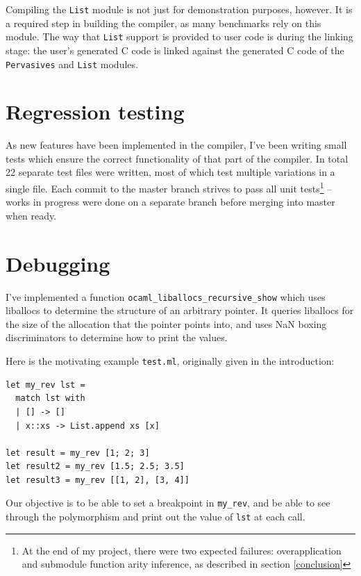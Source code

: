 \documentclass[12pt,a4paper,twoside,openright]{report}
\begin{document}
Compiling the \lstinline!List! module is not just for demonstration purposes,
however. It is a required step in building the compiler, as many benchmarks
rely on this module. The way that \lstinline!List! support is provided to user
code is during the linking stage: the user's generated C code is linked
against the generated C code of the \lstinline!Pervasives! and \lstinline!List!
modules.

\section{Regression testing}\label{regression-testing}

As new features have been implemented in the compiler, I've been writing small
tests which ensure the correct functionality of that part of the compiler. In
total 22 separate test files were written, most of which test multiple
variations in a single file. Each commit to the master branch strives to pass
all unit tests\footnote{At the end of my project, there were two expected
  failures: overapplication and submodule function arity inference, as
  described in section \ref{conclusion}}
-- works in progress were done on a separate branch before merging into master
when ready.

\section{Debugging}\label{debugging}

I've implemented a function
\lstinline!ocaml_liballocs_recursive_show! which uses
liballocs to determine the structure of an arbitrary pointer. It queries
liballocs for the size of the allocation that the pointer points into, and
uses NaN boxing discriminators to determine how to print the values.

Here is the motivating example \lstinline!test.ml!, originally given in the
introduction:

\begin{lstlisting}
let my_rev lst =
  match lst with
  | [] -> []
  | x::xs -> List.append xs [x]

let result = my_rev [1; 2; 3]
let result2 = my_rev [1.5; 2.5; 3.5]
let result3 = my_rev [[1, 2], [3, 4]]
\end{lstlisting}

Our objective is to be able to set a breakpoint in \lstinline!my_rev!, and be
able to see through the polymorphism and print out the value of \lstinline!lst!
at each call.
\end{document}
